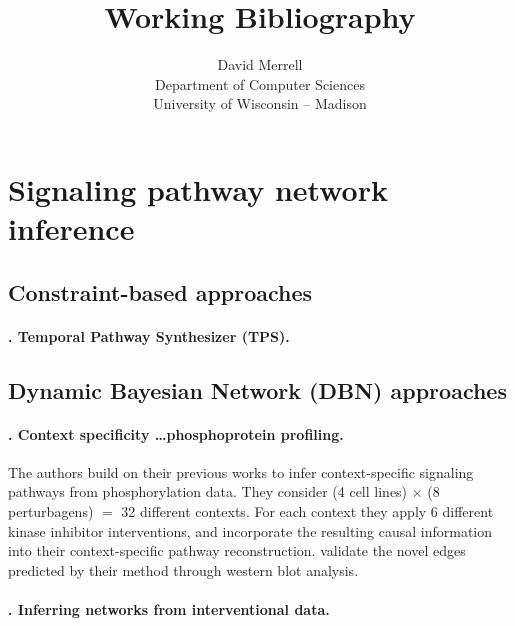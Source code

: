 \documentclass[14pt]{article}
\date{}
\begin{document}
\title{Working Bibliography}

\author{David Merrell \\ Department of Computer Sciences \\ University of Wisconsin -- Madison}

\maketitle{}

\thispagestyle{empty}


\section{Signaling pathway network inference}

\subsection{Constraint-based approaches}

\paragraph{ \citet{2018-koksal-tps}. Temporal Pathway Synthesizer (TPS). }




\subsection{Dynamic Bayesian Network (DBN) approaches}

\paragraph{ \citet{2017-hill-context}. Context specificity \ldots phosphoprotein profiling.}
The authors build on their previous works 
\citep{2015-spencer-interventional} 
\citep{2014-oates-joint}
to infer context-specific signaling pathways from phosphorylation data.
They consider (4 cell lines) $\times$ (8 perturbagens) $=$ 32 different contexts.
For each context they apply 6 different kinase inhibitor interventions, and incorporate the resulting causal information into their context-specific pathway reconstruction.
\citeauthor{2017-hill-context} validate the novel edges predicted by their method through western blot analysis.

\paragraph{ \citet{2015-spencer-interventional}. Inferring networks from interventional data.}
\end{document}
